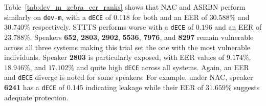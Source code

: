 \documentclass[12pt,leqno,a4paper]{article}
\begin{document}
Table~\ref{tab:dev_m_zebra_eer_ranks} shows that NAC and ASRBN perform similarly on \texttt{dev-m}, with a \texttt{dECE} of $0.118$ for both and an EER of $30.588\%$ and $30.740\%$ respectively. STTTS performs worse with a \texttt{dECE} of $0.196$ and an EER of $23.788\%$. Speakers \textbf{652}, \textbf{2803}, \textbf{2902}, \textbf{5536}, \textbf{7976}, and \textbf{8297} remain vulnerable across all three systems making this trial set the one with the most vulnerable individuals. Speaker \textbf{2803} is 
particularly exposed, with EER values of $9.174\%$, $18.946\%$, and $17.102\%$ and quite high \texttt{dECE} across all systems. Again, an EER and \texttt{dECE} diverge is noted for some speakers: For example, under NAC, speaker \textbf{6241} has a \texttt{dECE} of $0.145$ indicating leakage while their EER of $31.659\%$ suggests adequate protection.
\end{document}
